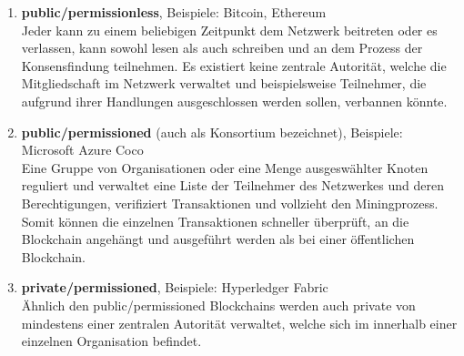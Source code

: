         \begin{enumerate}
            \item \textbf{public/permissionless}, Beispiele: Bitcoin, Ethereum\\
                Jeder kann zu einem beliebigen Zeitpunkt dem Netzwerk beitreten oder es verlassen, kann sowohl lesen als auch schreiben und an dem Prozess der Konsensfindung teilnehmen. 
                Es existiert keine zentrale Autorität, welche die Mitgliedschaft im Netzwerk verwaltet und beispielsweise Teilnehmer, die aufgrund ihrer Handlungen ausgeschlossen werden sollen, verbannen könnte. 
            \item \textbf{public/permissioned} (auch als Konsortium bezeichnet), Beispiele: Microsoft Azure Coco\\
                Eine Gruppe von Organisationen oder eine Menge ausgeswählter Knoten reguliert und verwaltet eine Liste der Teilnehmer des Netzwerkes und deren Berechtigungen, verifiziert Transaktionen und vollzieht den Miningprozess. 
                Somit können die einzelnen Transaktionen schneller überprüft, an die Blockchain angehängt und ausgeführt werden als bei einer öffentlichen Blockchain.
            \item \textbf{private/permissioned}, Beispiele: Hyperledger Fabric\\
                Ähnlich den public/permissioned Blockchains werden auch private von mindestens einer zentralen Autorität verwaltet, welche sich im innerhalb einer einzelnen Organisation befindet.
        \end{enumerate}
